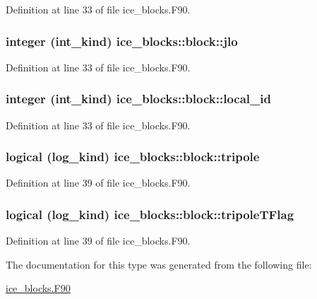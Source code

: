 Definition at line 33 of file ice\_\-blocks.F90.\hypertarget{typeice__blocks_1_1block_ac42b17cf254ead5ab8c41c9c40556833}{
\subsubsection[{jlo}]{\setlength{\rightskip}{0pt plus 5cm}integer (int\_\-kind) {\bf ice\_\-blocks::block::jlo}}}
\label{typeice__blocks_1_1block_ac42b17cf254ead5ab8c41c9c40556833}


Definition at line 33 of file ice\_\-blocks.F90.\hypertarget{typeice__blocks_1_1block_a121a7f594cb941d46b365ca28ba6c08b}{
\subsubsection[{local\_\-id}]{\setlength{\rightskip}{0pt plus 5cm}integer (int\_\-kind) {\bf ice\_\-blocks::block::local\_\-id}}}
\label{typeice__blocks_1_1block_a121a7f594cb941d46b365ca28ba6c08b}


Definition at line 33 of file ice\_\-blocks.F90.\hypertarget{typeice__blocks_1_1block_a5addb9117a4edb4f17580cbc681c7122}{
\subsubsection[{tripole}]{\setlength{\rightskip}{0pt plus 5cm}logical (log\_\-kind) {\bf ice\_\-blocks::block::tripole}}}
\label{typeice__blocks_1_1block_a5addb9117a4edb4f17580cbc681c7122}


Definition at line 39 of file ice\_\-blocks.F90.\hypertarget{typeice__blocks_1_1block_abf16a424a7624c7571a818877c7ad5a4}{
\subsubsection[{tripoleTFlag}]{\setlength{\rightskip}{0pt plus 5cm}logical (log\_\-kind) {\bf ice\_\-blocks::block::tripoleTFlag}}}
\label{typeice__blocks_1_1block_abf16a424a7624c7571a818877c7ad5a4}


Definition at line 39 of file ice\_\-blocks.F90.

The documentation for this type was generated from the following file:\begin{DoxyCompactItemize}
\item 
\hyperlink{ice__blocks_8F90}{ice\_\-blocks.F90}\end{DoxyCompactItemize}
